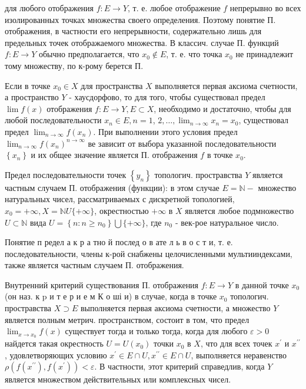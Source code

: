 \documentclass[10pt]{article}
\begin{document}
для любого отображения $f: E \rightarrow Y$, т. е. любое отображение $f$ непрерывно во всех изолированных точках множества своего определения. Поэтому понятие П. отображения, в частности его непрерывности, содержательно лишь для предельных точек отображаемого множества. В классич. случае П. функций $f: E \rightarrow Y$ обычно предполагается, что $x_{0} \notin E$, т. е. что точка $x_{0}$ не принадлежит тому множеству, по к-рому берется П.



Если в точке $x_{0} \in X$ для пространства $X$ выполняется первая аксиома счетности, а пространство $Y$ - хаусдорфово, то для того, чтобы существовал предел $\lim f(x)$ отображения $f: E \rightarrow Y, E \subset X$, необходимо и достаточно, чтобы для любой последовательности $x_{n} \in E, n=1$, $2, \ldots, \lim _{n \rightarrow \infty} x_{n}=x_{0}$, существовал предел $\lim _{n \rightarrow \infty} f\left(x_{n}\right)$. При выполнении этого условия предел $\lim _{n \rightarrow \infty} f\left(x_{n}\right)^{n \rightarrow \infty}$ ве зависит от выбора указанной последовательности $\left\{x_{n}\right\}$ и их общее значение является П. отображения $f$ в точке $x_{0}$.



Предел последовательности точек $\left\{y_{n}\right\}$ топологич. простравства $Y$ является частным случаем П. отображения (функции): в этом случае $E=\mathbb{N}-$ множество натуральных чисел, рассматриваемых с дискретной топологией, $x_{0}=+\infty, X=\mathbb{N} U\{+\infty\}$, окрестностью $+\infty$ в $X$ является любое подмножество $U \subset \mathbb{N}$ вида $U=\left\{n: n \geqslant n_{0}\right\} \bigcup\{+\infty\}$, где $n_{0}$ - век-рое натуральное число.



Понятие п редел а к р а тно й послед о в ате л ь в о с т и, т. е. последовательности, члены к-рой снабжены целочисленными мультииндексами, также является частным случаем П. отображения.



Внутренний критерий существования П. отображения $f: E \rightarrow Y$ в данной точке $x_{0}$ (он наз. к $\mathrm{p}$ и т е р и е м К о ші и) в случае, когда в точке $x_{0}$ топологич. простравства $X \supset E$ выполняется первая аксиома счетности, а множество $Y$ является полным метрич. пространством, состоит в том, что предел $\lim _{x \rightarrow x_{0}} f(x)$ существует тогда и только тогда, когда для любого $\varepsilon>0$ найдется такая окрестность $U=U\left(x_{0}\right)$ точки $x_{0}$ в $X$, что для всех точек $x^{\prime}$ и $x^{\prime \prime}$, удовлетворяющих условию $x^{\prime} \in E \cap U, x^{\prime \prime} \in E \cap U$, выполняется неравенство $\rho\left(f\left(x^{\prime \prime}\right), f\left(x^{\prime}\right)\right)<\varepsilon$. В частности, этот критерий справедлив, когда $Y$ является множеством действительных или комплексных чисел.
\end{document}
